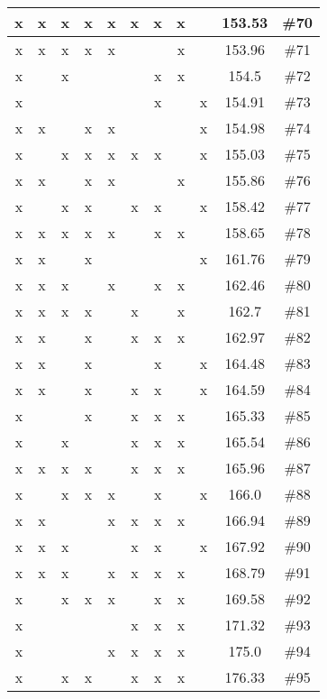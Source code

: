 \begin{center}
\begin{longtable}{|c|c|c|c|c|c|c|c|c|c|c|}
 x &  x &  x &  x &  x &  x &  x &  x &  & 153.53 & \#70 \\ \hline
 x &  x &  x &  x &  x &  &  &  x &  & 153.96 & \#71 \\ \hline
 x &  &  x &  &  &  &  x &  x &  & 154.5 & \#72 \\ \hline
 x &  &  &  &  &  &  x &  &  x & 154.91 & \#73 \\ \hline
 x &  x &  &  x &  x &  &  &  &  x & 154.98 & \#74 \\ \hline
 x &  &  x &  x &  x &  x &  x &  &  x & 155.03 & \#75 \\ \hline
 x &  x &  &  x &  x &  &  &  x &  & 155.86 & \#76 \\ \hline
 x &  &  x &  x &  &  x &  x &  &  x & 158.42 & \#77 \\ \hline
 x &  x &  x &  x &  x &  &  x &  x &  & 158.65 & \#78 \\ \hline
 x &  x &  &  x &  &  &  &  &  x & 161.76 & \#79 \\ \hline
 x &  x &  x &  &  x &  &  x &  x &  & 162.46 & \#80 \\ \hline
 x &  x &  x &  x &  &  x &  &  x &  & 162.7 & \#81 \\ \hline
 x &  x &  &  x &  &  x &  x &  x &  & 162.97 & \#82 \\ \hline
 x &  x &  &  x &  &  &  x &  &  x & 164.48 & \#83 \\ \hline
 x &  x &  &  x &  &  x &  x &  &  x & 164.59 & \#84 \\ \hline
 x &  &  &  x &  &  x &  x &  x &  & 165.33 & \#85 \\ \hline
 x &  &  x &  &  &  x &  x &  x &  & 165.54 & \#86 \\ \hline
 x &  x &  x &  x &  &  x &  x &  x &  & 165.96 & \#87 \\ \hline
 x &  &  x &  x &  x &  &  x &  &  x & 166.0 & \#88 \\ \hline
 x &  x &  &  &  x &  x &  x &  x &  & 166.94 & \#89 \\ \hline
 x &  x &  x &  &  &  x &  x &  &  x & 167.92 & \#90 \\ \hline
 x &  x &  x &  &  x &  x &  x &  x &  & 168.79 & \#91 \\ \hline
 x &  &  x &  x &  x &  &  x &  x &  & 169.58 & \#92 \\ \hline
 x &  &  &  &  &  x &  x &  x &  & 171.32 & \#93 \\ \hline
 x &  &  &  &  x &  x &  x &  x &  & 175.0 & \#94 \\ \hline
 x &  &  x &  x &  &  x &  x &  x &  & 176.33 & \#95 \\ \hline

\end{longtable}
\end{center}

